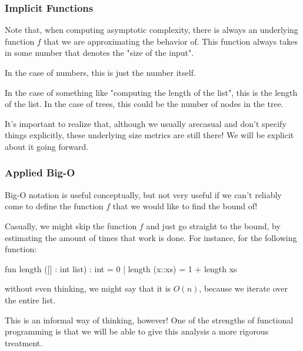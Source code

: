 \documentclass[aspectratio=169, handout]{beamer}
\begin{document}
\begin{frame}[fragile]
  \frametitle{Implicit Functions}

  Note that, when computing asymptotic complexity, there is always an underlying
  function $f$ that we are approximating the behavior of. This function always
  takes in some number that denotes the "size of the input".

  \vspace{\fill}

  In the case of numbers, this is just the number itself.

  \pause
  \vspace{\fill}

  In the case of something like "computing the length of the list", this is the
  length of the list. In the case of trees, this could be the number of nodes in
  the tree.
  
  \pause
  \vspace{\fill}

  It's important to realize that, although we usually arecasual and don't specify 
  things explicitly, these underlying size metrics are still there! We will be 
  explicit about it going forward.
\end{frame}


\begin{frame}[fragile]
  \frametitle{Applied Big-O}

  Big-O notation is useful conceptually, but not very useful if we can't reliably
  come to define the function $f$ that we would like to find the bound of!

  \pause
  \vspace{\fill}

  Casually, we might skip the function $f$ and just go straight to the bound, by
  estimating the amount of times that work is done. For instance, for the following
  function:

  \pause
  \vspace{5pt}

  \begin{codeblock}
    fun length ([] : int list) : int = 0
      | length (x::xs) = 1 + length xs
  \end{codeblock}

  \pause
  \vspace{5pt}

  without even thinking, we might say that it is $O(n)$, because we iterate over
  the entire list.

  \pause
  \vspace{\fill}

  This is an informal way of thinking, however! One of the strengths of functional
  programming is that we will be able to give this analysis a more rigorous
  treatment.
\end{frame}
\end{document}
